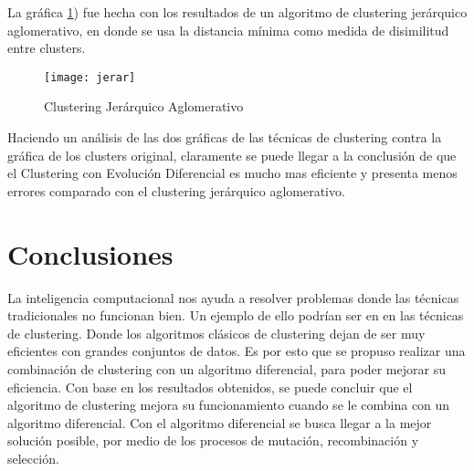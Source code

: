 \documentclass[
]{article}
\begin{document}
La gráfica \ref{fig:jerar}) fue hecha con los resultados de un algoritmo de clustering jerárquico aglomerativo, en donde se usa la distancia mínima como medida de disimilitud entre clusters.

\begin{figure}[h]
  \centering
    \texttt{[image: jerar]}
  \caption{Clustering Jerárquico Aglomerativo}
  \label{fig:jerar}
\end{figure}

Haciendo un análisis de las dos gráficas de las técnicas de clustering contra la gráfica de los clusters original, claramente se puede llegar a la conclusión de que el Clustering con Evolución Diferencial es mucho mas eficiente y presenta menos errores comparado con el clustering jerárquico aglomerativo.

\section{Conclusiones}
La inteligencia computacional nos ayuda a resolver problemas donde las técnicas tradicionales no funcionan bien. Un ejemplo de ello podrían ser en en las técnicas de clustering. Donde los algoritmos clásicos de clustering dejan de ser muy eficientes con grandes conjuntos de datos. 
Es por esto que se propuso realizar una combinación de clustering con un algoritmo diferencial, para poder mejorar su eficiencia.
Con base en los resultados obtenidos, se puede concluir que el algoritmo de clustering mejora su funcionamiento cuando se le combina con un algoritmo diferencial. Con el algoritmo diferencial se busca llegar a la mejor solución posible, por medio de los procesos de mutación, recombinación y selección.
\end{document}
